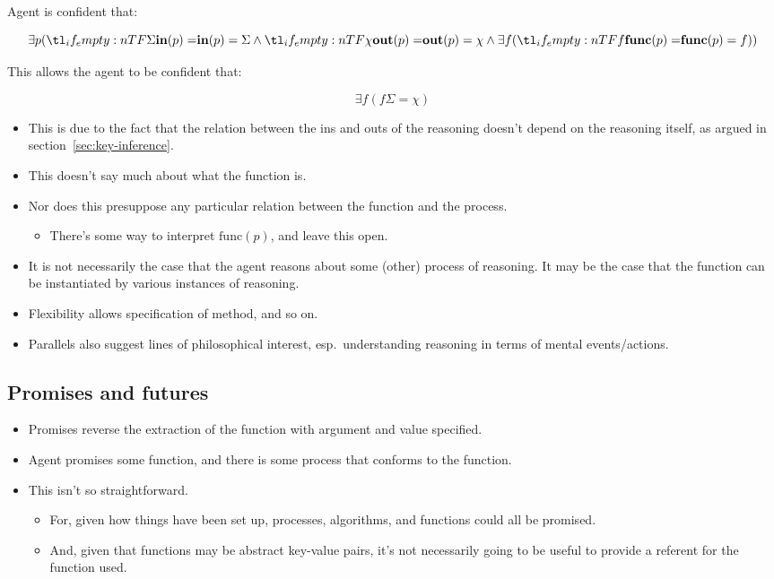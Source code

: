 \documentclass[10pt]{article}
\newcommand{\hozline}[0]{%
  \noindent\hdashrule[0.5ex][c]{\textwidth}{.1pt}{}
}
\begin{document}
Agent is confident that:

\[\exists p(\ein[p]{\Sigma} \land \eout[p]{\chi} \land \exists f(\efunc[p]{f}))\]

This allows the agent to be confident that:

\[\exists f(f\Sigma = \chi)\]

\begin{itemize}
\item This is due to the fact that the relation between the ins and outs of the reasoning doesn't depend on the reasoning itself, as argued in section~\ref{sec:key-inference}.
\item This doesn't say much about what the function is.
\item Nor does this presuppose any particular relation between the function and the process.
  \begin{itemize}
  \item There's some way to interpret \(\text{func}(p)\), and leave this open.
  \end{itemize}
\item It is not necessarily the case that the agent reasons about some (other) process of reasoning.
  It may be the case that the function can be instantiated by various instances of reasoning.
\end{itemize}

\begin{itemize}
\item Flexibility allows specification of method, and so on.
\item Parallels also suggest lines of philosophical interest, esp.\ understanding reasoning in terms of mental events/actions.
\end{itemize}

\hozline


\subsection{Promises and futures}
\label{sec:promises-futures}

\begin{itemize}
\item Promises reverse the extraction of the function with argument and value specified.
\item Agent promises some function, and there is some process that conforms to the function.
\item This isn't so straightforward.
  \begin{itemize}
  \item For, given how things have been set up, processes, algorithms, and functions could all be promised.
  \item And, given that functions may be abstract key-value pairs, it's not necessarily going to be useful to provide a referent for the function used.
  \end{itemize}
\end{itemize}
\end{document}
